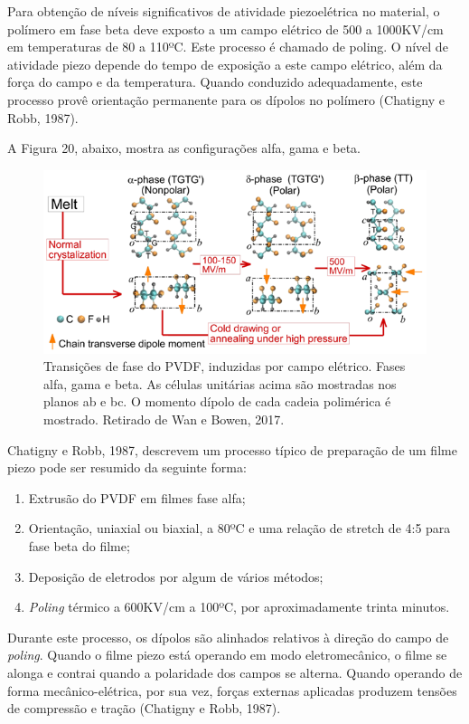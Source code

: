 \documentclass[
	12pt,				
	oneside,			
	a4paper,			
	english,			
	brazil				
	]{abntex2ppgsi}
\begin{document}
Para obtenção de níveis significativos de atividade piezoelétrica no material, o polímero em fase beta deve exposto a um campo elétrico de 500 a 1000KV/cm em temperaturas de 80 a 110ºC. Este processo é chamado de poling. O nível de atividade piezo depende do tempo de exposição a este campo elétrico, além da força do campo e da temperatura. Quando conduzido adequadamente, este processo provê orientação permanente para os dípolos no polímero (Chatigny e Robb, 1987). 

A Figura 20, abaixo, mostra as configurações alfa, gama e beta.

\begin{figure}[!htb]
\centering
\includegraphics{Figura20}
\caption {Transições de fase do PVDF, induzidas por campo elétrico. Fases alfa, gama e beta. As células unitárias acima são mostradas nos planos ab e bc. O momento dípolo de cada cadeia polimérica é mostrado. Retirado de Wan e Bowen, 2017.}
\label{Figura20}
\end{figure}

Chatigny e Robb, 1987, descrevem um processo típico de preparação de um filme piezo pode ser resumido da seguinte forma:

\begin{enumerate}
	\item Extrusão do PVDF em filmes fase alfa; 
	\item Orientação, uniaxial ou biaxial, a 80ºC e uma relação de stretch de 4:5 para fase beta do filme;
	\item Deposição de eletrodos por algum de vários métodos;
	\item \textit{Poling} térmico a 600KV/cm a 100ºC, por aproximadamente trinta minutos.
\end{enumerate}

Durante este processo, os dípolos são alinhados relativos à direção do campo de \textit{poling}. Quando o filme piezo está operando em modo eletromecânico, o filme se alonga e contrai quando a polaridade dos campos se alterna. Quando operando de forma mecânico-elétrica, por sua vez, forças externas aplicadas produzem tensões de compressão e tração (Chatigny e Robb, 1987). 
\end{document}
